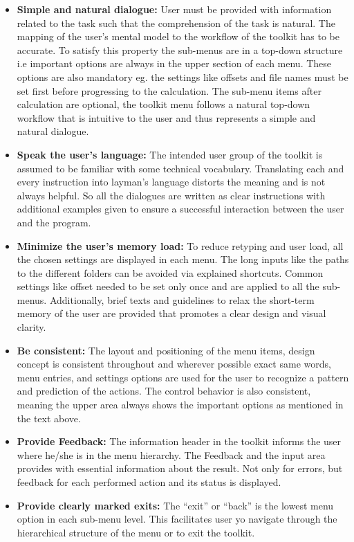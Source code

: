 \begin{itemize}
	\item \textbf{Simple and natural dialogue:} User must be provided with information related to the task such that the comprehension of the task is natural. The mapping of the user's mental model to the workflow of the toolkit has to be accurate. To satisfy this property the sub-menus are in a top-down structure i.e important options are always in the upper section of each menu. These options are also mandatory eg. the settings like offsets and file names must be set first before
		progressing to the calculation. The sub-menu items after calculation are optional, the toolkit menu follows a natural top-down workflow that is intuitive to the user and thus represents a simple and natural dialogue.
	\item \textbf{Speak the user's language:} The intended user group of the toolkit is assumed to be familiar with some technical vocabulary. Translating each and every instruction into layman's language distorts the meaning and is not always helpful. So all the dialogues are written as clear instructions with additional examples given to ensure a successful interaction between the user and the program.
	\item \textbf{Minimize the user's memory load:} To reduce retyping and user load, all the chosen settings are displayed in each menu. The long inputs like the paths to the different folders can be avoided via explained shortcuts. Common settings like offset needed to be set only once and are applied to all the sub-menus. Additionally, brief texts and guidelines to relax the short-term memory of the user are provided that promotes a clear design and visual clarity.
	\item \textbf{Be consistent:} The layout and positioning of the menu items, design concept is consistent throughout and wherever possible exact same words, menu entries, and settings options are used for the user to recognize a pattern and prediction of the actions. The control behavior is also consistent, meaning the upper area always shows the important options as mentioned in the text above.
	\item \textbf{Provide Feedback:} The information header in the toolkit informs the user where he/she is in the menu hierarchy. The Feedback and the input area provides with essential information about the result. Not only for errors, but feedback for each performed action and its status is displayed.
	\item \textbf{Provide clearly marked exits:} The ``exit'' or ``back'' is the lowest menu option in each sub-menu level. This facilitates user yo navigate through the hierarchical structure of the menu or to exit the toolkit.

\end{itemize}
